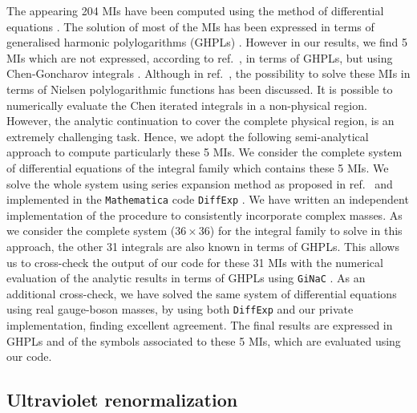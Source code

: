 \documentclass[a4paper]{jpconf}
\begin{document}
The appearing 204 MIs have been computed using 
the method of differential equations \cite{Kotikov:1990kg,Remiddi:1997ny,Gehrmann:1999as,Argeri:2007up,Henn:2014qga,Ablinger:2015tua,Ablinger:2018zwz}.
% 
The solution of most of the MIs has been expressed 
in terms of generalised harmonic polylogarithms (GHPLs) \cite{Goncharov:polylog,Goncharov:2001iea,Remiddi:1999ew}.
% 
However in our results, we find 5 MIs which are not expressed,
according to ref.~\cite{Bonciani:2016ypc},
in terms of GHPLs, but using Chen-Goncharov integrals \cite{Chen:1977oja}.
% 
Although in ref.~\cite{Heller:2019gkq}, the possibility to solve these MIs in terms of Nielsen polylogarithmic functions has been discussed.
% 
It is possible to numerically evaluate the Chen iterated integrals \cite{Chen:1977oja}
in a non-physical region. However, the analytic continuation to cover the complete 
physical region, is an extremely challenging task.
% 
Hence, we adopt the following semi-analytical approach to compute particularly these 5 MIs.
% 
We consider the complete system of differential equations of the integral family which contains these 5 MIs.
We solve the whole system using series expansion method as proposed in ref.~\cite{Moriello:2019yhu}
and implemented in the {\tt Mathematica} code {\tt DiffExp} \cite{Hidding:2020ytt}.
We have written an independent implementation \cite{SeaFire} of the procedure to consistently incorporate complex masses.
% 
As we consider the complete system ($36 \times 36$) for the integral family to solve in this approach, 
the other 31 integrals are also known in terms of GHPLs.
% 
This allows us to cross-check the output of our code for these 31 MIs 
with the numerical evaluation of the analytic results in terms of GHPLs
using {\tt GiNaC} \cite{Vollinga:2004sn}. 
% 
As an additional cross-check,
we have solved the same system of differential equations
using real gauge-boson masses,
by using both {\tt DiffExp} and our private implementation, finding excellent agreement.
% 
The final results are expressed in GHPLs and of the symbols associated to these 5 MIs, which are evaluated using our code.

%


\subsection{Ultraviolet renormalization}
\end{document}

